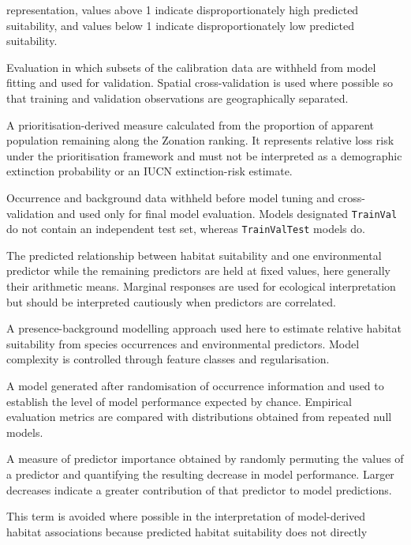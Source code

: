 \documentclass[
  openany]{book}
\let\OldTexttt\texttt
\renewcommand{\texttt}[1]{%
  \OldTexttt{\small #1}%
}
\begin{document}
\begin{description}
representation, values above 1 indicate disproportionately high predicted
suitability, and values below 1 indicate disproportionately low predicted suitability.
\item[\textbf{Cross-validation}]
Evaluation in which subsets of the calibration data are withheld from model
fitting and used for validation. Spatial cross-validation is used where possible
so that training and validation observations are geographically separated.
\item[\textbf{Extinction-risk proxy}]
A prioritisation-derived measure calculated from the proportion of apparent
population remaining along the Zonation ranking. It represents relative loss risk
under the prioritisation framework and must not be interpreted as a demographic
extinction probability or an IUCN extinction-risk estimate.
\item[\textbf{Independent test set}]
Occurrence and background data withheld before model tuning and cross-validation
and used only for final model evaluation. Models designated \texttt{TrainVal} do not
contain an independent test set, whereas \texttt{TrainValTest} models do.
\item[\textbf{Marginal response}]
The predicted relationship between habitat suitability and one environmental
predictor while the remaining predictors are held at fixed values, here generally
their arithmetic means. Marginal responses are used for ecological interpretation
but should be interpreted cautiously when predictors are correlated.
\item[\textbf{Maxent}]
A presence-background modelling approach used here to estimate relative habitat
suitability from species occurrences and environmental predictors. Model complexity
is controlled through feature classes and regularisation.
\item[\textbf{Null model}]
A model generated after randomisation of occurrence information and used to
establish the level of model performance expected by chance. Empirical evaluation
metrics are compared with distributions obtained from repeated null models.
\item[\textbf{Permutation importance}]
A measure of predictor importance obtained by randomly permuting the values of
a predictor and quantifying the resulting decrease in model performance.
Larger decreases indicate a greater contribution of that predictor to model predictions.
\item[\textbf{Preference}]
This term is avoided where possible in the interpretation of model-derived
habitat associations because predicted habitat suitability does not directly

\end{description}
\end{document}
